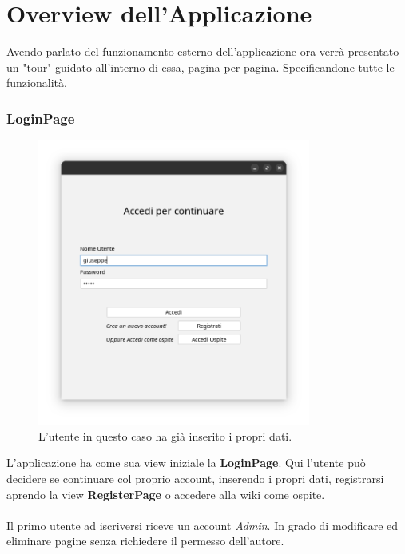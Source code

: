\documentclass{article}
\begin{document}
	\newpage

	
	\section{Overview dell'Applicazione}
	Avendo parlato del funzionamento esterno dell'applicazione ora verr\`a presentato un "tour" guidato all'interno di essa, pagina per pagina. Specificandone tutte le funzionalit\`a.
	
	\subsubsection{LoginPage}
	
	\begin{figure}[htbp]
		\centering
		\includegraphics[width=0.8\textwidth,height=0.8\textheight,keepaspectratio]{login_page.png}
		\caption{L'utente in questo caso ha gi\`a inserito i propri dati.}
		\label{fig:1}
	\end{figure}
	
	L'applicazione ha come sua view iniziale la \textbf{LoginPage}. Qui l'utente pu\`o decidere se continuare col proprio account, inserendo i propri dati, registrarsi aprendo la view \textbf{RegisterPage} o accedere alla wiki come ospite.
	\\\\
	Il primo utente ad iscriversi riceve un account {\itshape{Admin}}. In grado di modificare ed eliminare pagine senza richiedere il permesso dell'autore.
	
\end{document}
